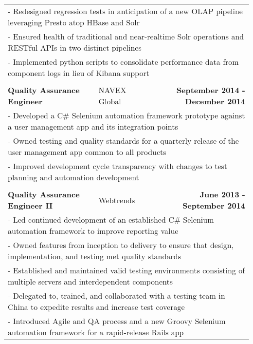 \documentclass[letterpaper]{article}
\begin{document}
\begin{center}
\begin{tabular}{p{}p{}r}
				\multicolumn{3}{p{\textwidth}}{\quad\quad - Redesigned regression tests in anticipation of a new OLAP pipeline leveraging Presto atop HBase and Solr} 
			\\
				\multicolumn{3}{p{\textwidth}}{\quad\quad - Ensured health of traditional and near-realtime Solr operations and RESTful APIs in two distinct pipelines } 
			\\
				\multicolumn{3}{p{\textwidth}}{\quad\quad - Implemented python scripts to consolidate performance data from component logs in lieu of Kibana support } 
			\\
			\\
				\textbf{Quality Assurance Engineer}									&
				NAVEX Global										&
				\textbf{September 2014 - December 2014}
			\\
				\multicolumn{3}{p{\textwidth}}{\quad\quad - Developed a C\# Selenium automation framework prototype against a user management app and its integration points} 
			\\
				\multicolumn{3}{p{\textwidth}}{\quad\quad - Owned testing and quality standards for a quarterly release of the user management app common to all products} 
			\\
				\multicolumn{3}{p{\textwidth}}{\quad\quad - Improved development cycle transparency with changes to test planning and automation development} 
			\\
			\\
				\textbf{Quality Assurance Engineer II}					&
				Webtrends							&
				\textbf{June 2013 - September 2014}
			\\
				\multicolumn{3}{p{\textwidth}}{\quad\quad - Led continued development of an established C\# Selenium automation framework to improve reporting value}
			\\
				\multicolumn{3}{p{\textwidth}}{\quad\quad - Owned features from inception to delivery to ensure that design, implementation, and testing met quality standards} 
			\\
				\multicolumn{3}{p{\textwidth}}{\quad\quad - Established and maintained valid testing environments consisting of multiple servers and interdependent components} 
			\\
				\multicolumn{3}{p{\textwidth}}{\quad\quad - Delegated to, trained, and collaborated with a testing team in China to expedite results and increase test coverage}
			\\
				\multicolumn{3}{p{\textwidth}}{\quad\quad - Introduced Agile and QA process and a new Groovy Selenium automation framework for a rapid-release Rails app}  

\end{tabular}
\end{center}
\end{document}
